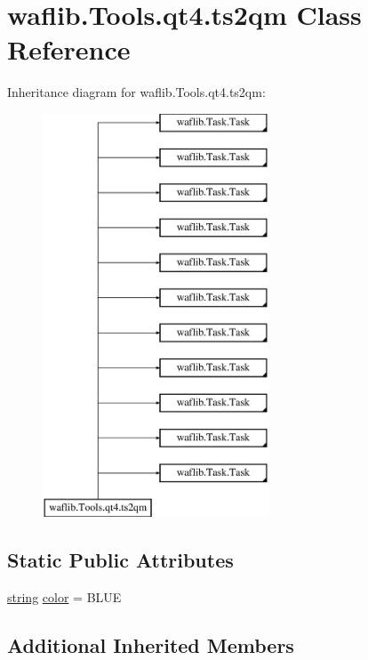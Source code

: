 \hypertarget{classwaflib_1_1_tools_1_1qt4_1_1ts2qm}{}\section{waflib.\+Tools.\+qt4.\+ts2qm Class Reference}
\label{classwaflib_1_1_tools_1_1qt4_1_1ts2qm}
Inheritance diagram for waflib.\+Tools.\+qt4.\+ts2qm\+:\begin{figure}[H]
\begin{center}
\leavevmode
\includegraphics[height=12.000000cm]{classwaflib_1_1_tools_1_1qt4_1_1ts2qm}
\end{center}
\end{figure}
\subsection*{Static Public Attributes}
\begin{DoxyCompactItemize}
\item 
\hyperlink{test__lib_f_l_a_c_2format_8c_ab02026ad0de9fb6c1b4233deb0a00c75}{string} \hyperlink{classwaflib_1_1_tools_1_1qt4_1_1ts2qm_ab1ca93ce9a16f3f2772617b9c0a30716}{color} = \textquotesingle{}B\+L\+UE\textquotesingle{}
\end{DoxyCompactItemize}
\subsection*{Additional Inherited Members}


